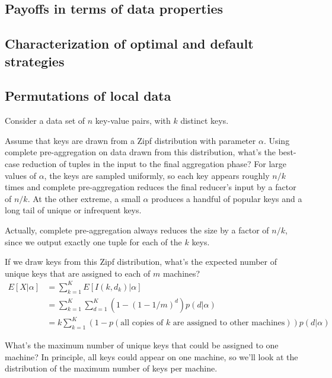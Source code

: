 \documentclass[12pt]{article}
\begin{document}
\subsection{Payoffs in terms of data properties}

\subsection{Characterization of optimal and default strategies}

\subsection{Permutations of local data}

Consider a data set of $n$ key-value pairs, with $k$ distinct keys.

Assume that keys are drawn from a Zipf distribution with parameter $\alpha$.
Using complete pre-aggregation on data drawn from this distribution, what's the best-case reduction of tuples in the input to the final aggregation phase?
For large values of $\alpha$, the keys are sampled uniformly, so each key appears roughly $n/k$ times and complete pre-aggregation reduces the final reducer's input by a factor of $n/k$.
At the other extreme, a small $\alpha$ produces a handful of popular keys and a long tail of unique or infrequent keys.

Actually, complete pre-aggregation always reduces the size by a factor of $n/k$, since we output exactly one tuple for each of the $k$ keys.


If we draw keys from this Zipf distribution, what's the expected number of unique keys that are assigned to each of $m$ machines?
\begin{align*}
    E[X|\alpha] &= \sum_{k=1}^K E[I(k, d_k) | \alpha]
\\              &= \sum_{k=1}^K \sum_{d=1}^K \left(1 - \left(1 - 1/m\right)^d\right)p(d | \alpha)
\\              &= k \sum_{k=1}^K\left(1 - p\left(\text{all copies of $k$ are assigned to other machines}\right)\right) p(d | \alpha)
\end{align*}

What's the maximum number of unique keys that could be assigned to one machine?  In principle, all keys could appear on one machine, so we'll look at the distribution of the maximum number of keys per machine.
\end{document}
